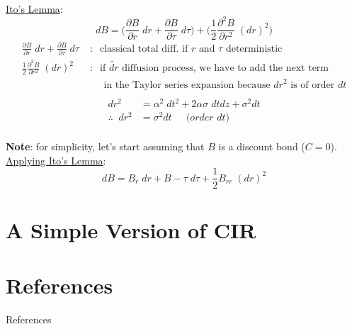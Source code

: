 \documentclass[
14pt,notheorems,hyperref={pdfauthor=whatever}
]{beamer}
\begin{document}
\begin{frame}
\underline{Ito's Lemma}:\\
\[ dB = \bigg(\frac{\partial B}{\partial r}\;dr + \frac{\partial B}{\partial \tau}\;d\tau\bigg) + \bigg(\frac{1}{2} \frac{\partial^2 B}{\partial r^2}\;(dr)^2\bigg)\]
\begin{align*}
    \frac{\partial B}{\partial r}\;dr + \frac{\partial B}{\partial \tau}\;d\tau \;&:\;\; \text{classical total diff. if $r$ and $\tau$ deterministic}\\
    \frac{1}{2} \frac{\partial^2 B}{\partial r^2}\;(dr)^2 \;&:\;\; \text{if $\tilde{dr}$ diffusion process, we have to add the next term}\\
    &\;\;\;\;\; \text{in the Taylor series expansion because $dr^2$ is of order $dt$}\\
\end{align*}
\begin{align*}
    dr^2 &= \alpha^2\;dt^2 + 2\alpha\sigma\;dtdz + \sigma^2dt\\
    \therefore \;\; dr^2 &= \sigma^2dt \;\;\;\; \textit{ (order $dt$)}\\
\end{align*}
\end{frame}

\begin{frame}
\textbf{Note}: for simplicity, let's start assuming that $B$ is a discount bond ($C=0$).\\
\hfill\break
\underline{Applying Ito's Lemma}:\\
\hfill\break
\begin{equation} \tag{2}
    dB = B_r\;dr + B-\tau\;d\tau + \frac{1}{2} B_{rr}\;(dr)^2
\end{equation}
\end{frame}

\section{A Simple Version of CIR}

\section*{References}
\begin{frame}[allowframebreaks]{References}
    \printbibliography
\end{frame}
\end{document}
